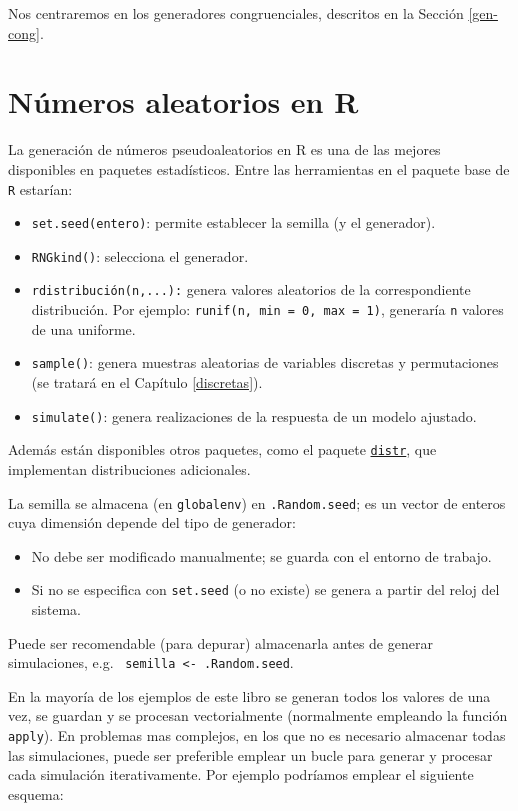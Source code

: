 \documentclass[
]{book}
\theoremstyle{break}
\theoremstyle{definition}
\theoremstyle{definition}
\theoremstyle{definition}
\theoremstyle{remark}
\let\BeginKnitrBlock\begin \let\EndKnitrBlock\end
\begin{document}
Nos centraremos en los generadores congruenciales, descritos en la Sección \ref{gen-cong}.

\hypertarget{rrng}{%
\chapter{Números aleatorios en R}\label{rrng}}

La generación de números pseudoaleatorios en R es una de las mejores
disponibles en paquetes estadísticos.
Entre las herramientas en el paquete base de \texttt{R} estarían:

\begin{itemize}
\item
  \texttt{set.seed(entero)}: permite establecer la semilla (y el
  generador).
\item
  \texttt{RNGkind()}: selecciona el generador.
\item
  \texttt{rdistribución(n,...):} genera valores aleatorios de la
  correspondiente distribución.
  Por ejemplo: \texttt{runif(n,\ min\ =\ 0,\ max\ =\ 1)}, generaría \texttt{n} valores de una uniforme.
\item
  \texttt{sample()}: genera muestras aleatorias de variables discretas y permutaciones (se tratará en el Capítulo \ref{discretas}).
\item
  \texttt{simulate()}: genera realizaciones de la respuesta de un modelo ajustado.
\end{itemize}

Además están disponibles otros paquetes, como el paquete \href{http://distr.r-forge.r-project.org}{\texttt{distr}},
que implementan distribuciones adicionales.

La semilla se almacena (en \texttt{globalenv}) en \texttt{.Random.seed}; es un vector
de enteros cuya dimensión depende del tipo de generador:

\begin{itemize}
\item
  No debe ser modificado manualmente; se guarda con el entorno
  de trabajo.
\item
  Si no se especifica con \texttt{set.seed} (o no existe) se genera a
  partir del reloj del sistema.
\end{itemize}

\BeginKnitrBlock{remark}
{}Puede ser recomendable (para depurar) almacenarla antes de generar simulaciones, e.g.~
\texttt{semilla\ \textless{}-\ .Random.seed}.
\EndKnitrBlock{remark}

En la mayoría de los ejemplos de este libro se generan todos los valores de una vez,
se guardan y se procesan vectorialmente (normalmente empleando la función \texttt{apply}).
En problemas mas complejos, en los que no es necesario almacenar todas las simulaciones,
puede ser preferible emplear un bucle para generar y procesar cada simulación iterativamente.
Por ejemplo podríamos emplear el siguiente esquema:
\end{document}
